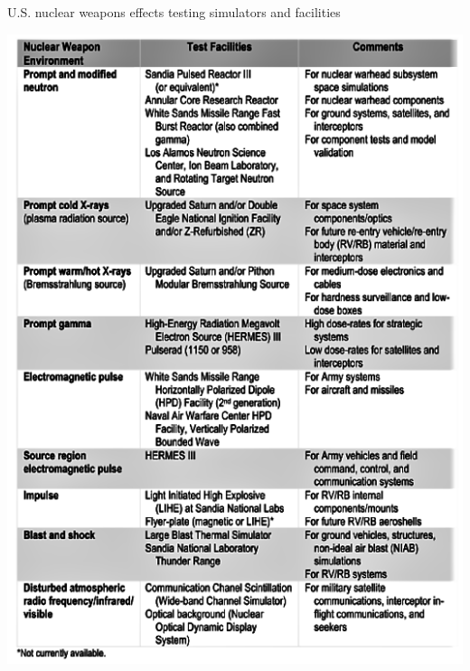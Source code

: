 \begin{table}[!]
    \centering
	\caption[U.S. nuclear weapons effects testing simulators and facilities]{U.S. nuclear weapons effects testing simulators and facilities\cite{JointDefenseScienceBoard/ThreatReductionAdvisoryComitteeTaskForce2010}}
	\includegraphics[width=\linewidth]{Figures/Chapter1/NWE.png}
	\label{tab:NWECap}
\end{table}


